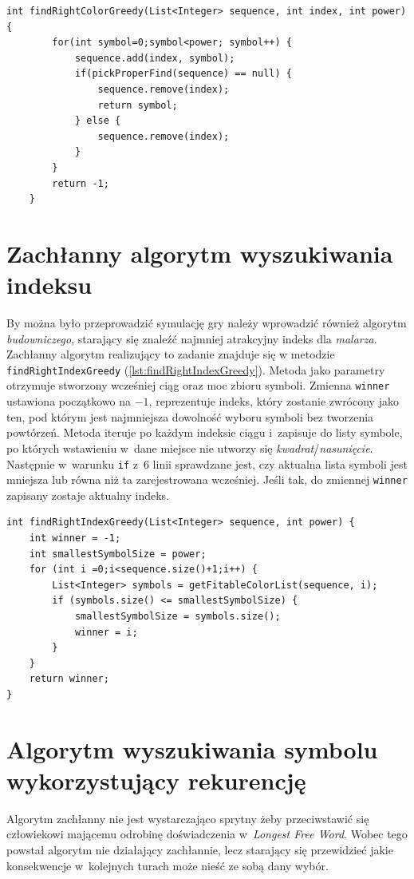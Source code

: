 \documentclass[document]{xmgr}
\begin{document}
\begin{lstlisting}[caption={Metoda zachłannie szukająca symbolu.},label=lst:findRightColorGreedy]
int findRightColorGreedy(List<Integer> sequence, int index, int power) {
		for(int symbol=0;symbol<power; symbol++) {
			sequence.add(index, symbol);
			if(pickProperFind(sequence) == null) {
				sequence.remove(index);
				return symbol;
			} else {
				sequence.remove(index);
			}
		}
		return -1;
	}
\end{lstlisting}

\section{Zachłanny algorytm wyszukiwania indeksu}
By można było przeprowadzić symulację gry należy wprowadzić również algorytm \emph{budowniczego}, starający się znaleźć najmniej atrakcyjny indeks dla \emph{malarza}. Zachłanny algorytm realizujący to zadanie znajduje się w metodzie \texttt{findRightIndexGreedy} (\ref{lst:findRightIndexGreedy}). Metoda jako parametry otrzymuje stworzony wcześniej ciąg oraz moc zbioru symboli. Zmienna \texttt{winner} ustawiona początkowo na $-1$, reprezentuje indeks, który zostanie zwrócony jako ten, pod którym jest najmniejsza dowolność wyboru symboli bez tworzenia powtórzeń. Metoda iteruje po każdym indeksie ciągu i~zapisuje do listy symbole, po których wstawieniu w~dane miejsce nie utworzy się \emph{kwadrat}/\emph{nasunięcie}. Następnie w~warunku \texttt{if} z~6 linii sprawdzane jest, czy aktualna lista symboli jest mniejsza lub równa niż ta zarejestrowana wcześniej. Jeśli tak, do zmiennej \texttt{winner} zapisany zostaje aktualny indeks.

\begin{lstlisting}[caption={Metoda zachłannie szukająca indeksu.},label=lst:findRightIndexGreedy]
int findRightIndexGreedy(List<Integer> sequence, int power) {
	int winner = -1;
	int smallestSymbolSize = power;
	for (int i =0;i<sequence.size()+1;i++) {
		List<Integer> symbols = getFitableColorList(sequence, i);
		if (symbols.size() <= smallestSymbolSize) {
			smallestSymbolSize = symbols.size();
			winner = i;
		}
	}
	return winner;
}
\end{lstlisting}

\section{Algorytm wyszukiwania symbolu wykorzystujący rekurencję}
Algorytm zachłanny nie jest wystarczająco sprytny żeby przeciwstawić się człowiekowi mającemu odrobinę doświadczenia w~\emph{Longest Free Word}. Wobec tego powstał algorytm nie działający zachłannie, lecz starający się przewidzieć jakie konsekwencje w~kolejnych turach może nieść ze sobą dany wybór.
\end{document}
